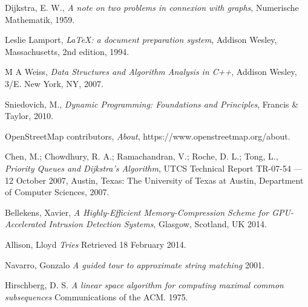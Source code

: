 \documentclass{article}
\begin{document}
\begin{framed}


\end{framed}
\newpage
{}
\begin{thebibliography}{9}
  Dijkstra, E. W.,
  \emph{A note on two problems in connexion with graphs},
  Numerische Mathematik,
  1959.
  
  Leslie Lamport,
  \emph{\LaTeX: a document preparation system},
  Addison Wesley, Massachusetts,
  2nd edition,
  1994.
  
  M A Weiss,
  \emph{Data Structures and Algorithm Analysis in C++},
  Addison Wesley,
  3/E. New York, NY,
  2007.
  
 Sniedovich, M.,
 \emph{Dynamic Programming: Foundations and Principles},
 Francis \& Taylor,
 2010.

OpenStreetMap contributors,
\emph{About},
https://www.openstreetmap.org/about.
  
  Chen, M.; Chowdhury, R. A.; Ramachandran, V.; Roche, D. L.; Tong, L.,
  \emph{Priority Queues and Dijkstra’s Algorithm},
   UTCS Technical Report TR-07-54 — 12 October 2007,
    Austin, Texas: The University of Texas at Austin, Department of Computer Sciences,
    2007.
    
  Bellekens, Xavier,
  \emph{A Highly-Efficient Memory-Compression Scheme for GPU-Accelerated Intrusion Detection Systems},
  Glasgow, Scotland, UK
  2014. 
  
Allison, Lloyd
\emph{Tries}
Retrieved 18 February 
2014.

Navarro, Gonzalo 
\emph{A guided tour to approximate string matching} 
2001. 

 Hirschberg, D. S. 
 \emph{A linear space algorithm for computing maximal common subsequences}
 Communications of the ACM. 
 1975.
 
\end{thebibliography}
\end{document}
